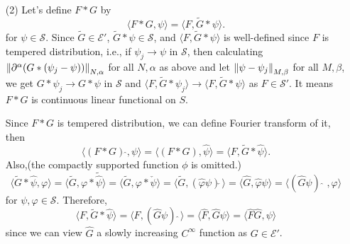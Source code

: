 \documentclass{article}
\begin{document}
\begin{enumerate}
\begin{proof}
\end{proof}
\item[(2)]
Let's define $F*G$ by
\begin{equation*}
\langle F*G,\psi\rangle=\langle F,\tilde{G}*\psi\rangle.
\end{equation*}
for $\psi\in \mathcal{S}$. Since $\tilde{G}\in \mathcal{E}'$, $\tilde{G}*\psi\in \mathcal{S}$, and $\langle F,\tilde{G}*\psi\rangle$ is well-defined since $F$ is tempered distribution, i.e., if $\psi_j\rightarrow \psi$ in $\mathcal{S}$, then calculating $\norm{\partial^\alpha(G*(\psi_j-\psi))}_{N,\alpha}$ for all $N,\alpha$ as above and let $\norm{\psi-\psi_j}_{M, \beta}$ for all $M,\beta$, we get $G*\psi_j\rightarrow G*\psi$ in $\mathcal{S}$ and $\langle F,\tilde{G}*\psi_j\rangle\rightarrow \langle F,\tilde{G}*\psi\rangle$ as $F\in \mathcal{S}'$. It means $F*G$ is continuous linear functional on $S$.

Since $F*G$ is tempered distribution, we can define Fourier transform of it, then
\begin{equation*}
\langle(F*G)\,\widehat{}, \psi\rangle=\langle(F*G), \hat{\psi}\rangle=\langle F, \tilde{G}*\hat{\psi}\rangle.
\end{equation*}
Also,(the compactly supported function $\phi$ is omitted.)
\begin{equation*}
\langle \tilde{G}*\hat{\psi}, \varphi\rangle=\langle \tilde{G}, \varphi*\tilde{\hat{\psi}}\rangle=\langle \tilde{G}, \varphi*\check{\psi}\rangle=\langle \tilde{G}, (\hat{\varphi}\psi)\check{}\,\rangle=\langle \hat{G}, \hat{\varphi}\psi\rangle=\langle (\hat{G}\psi)\,\widehat~~, \varphi\rangle
\end{equation*}
for $\psi, \varphi\in \mathcal{S}$. Therefore,
\begin{equation*}
\langle F, \tilde{G}*\hat{\psi}\rangle=\langle F,(\hat{G}\psi)\,\widehat~\rangle=\langle \hat{F},\hat{G}\psi\rangle=\langle\hat{F}\hat{G},\psi\rangle
\end{equation*}
since we can view $\hat{G}$ a slowly increasing $C^\infty$ function as $G\in \mathcal{E}'$.
\end{enumerate}
\end{document}
